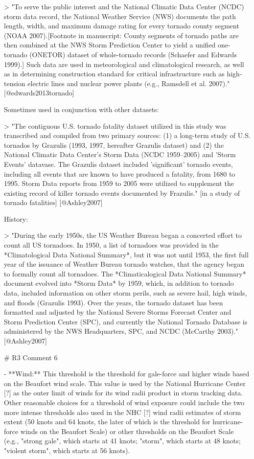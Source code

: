 > "To serve the public interest and the National Climatic Data Center (NCDC)
storm data record, the National Weather Service (NWS) documents the path length,
width, and maximum damage rating for every tornado county segment (NOAA
2007).[Footnote in manuscript: County segments of tornado paths are then
combined at the NWS Storm Prediction Center to yield a unified one-tornado
(ONETOR) dataset of whole-tornado records (Schaefer and Edwards 1999).] Such
data are used in meteorological and climatological research, as well as in
determining construction standard for critical infrastructure such as
high-tension electric lines and nuclear power plants (e.g., Ramsdell et al.
2007)." [@edwards2013tornado]

Sometimes used in conjunction with other datasets: 

> "The contiguous U.S. tornado fatality dataset utilized in this study was 
transcribed and compiled from two primary sources: (1) a long-term study of 
U.S. tornados by Grazulis (1993, 1997, hereafter Grazulis dataset) and 
(2) the National Climatic Data Center's Storm Data (NCDC 1959--2005) and 
'Storm Events' datavase. The Grazulis dataset included 'significant' tornado
events, including all events that are known to have produced a fatality, 
from 1680 to 1995. Storm Data reports from 1959 to 2005 were utilized to 
supplement the existing record of killer tornado events documented by 
Frazulis." [in a study of tornado fatalities] [@Ashley2007]

History: 

> "During the early 1950s, the US Weather Bureau began a concerted effort to
count all US tornadoes. In 1950, a list of tornadoes was provided in the
*Climatological Data National Summary*, but it was not until 1953, the first
full year of the issuance of Weather Bureau tornado watches, that the agency
began to formally count all tornadoes. The *Climaticalogical Data National
Summary* document evolved into *Storm Data* by 1959, which, in addition to
tornado data, included information on other storm perils, such as severe hail,
high winds, and floods (Grazulis 1993). Over the years, the tornado dataset has
been formatted and adjusted by the National Severe Storms Forecast Center and
Storm Prediction Center (SPC), and currently the National Tornado Database is
administered by the NWS Headquarters, SPC, and NCDC (McCarthy 2003)."
[@Ashley2007]

# R3 Comment 6

- **Wind:** This threshold is the threshold for gale-force and higher winds
based on the Beaufort wind scale. This value is used by the National Hurricane
Center [?] as the outer limit of winds for its wind radii product in storm 
tracking data. Other reasonable choices for a threshold of wind exposure 
could include the two more intense thresholds also used in the NHC [?] wind
radii estimates of storm extent (50 knots and 64 knots, the later of which 
is the threshold for hurricane-force winds on the Beaufort Scale) or other
thresholds on the Beaufort Scale (e.g., "strong gale", which starts at 
41 knots; "storm", which starts at 48 knots; "violent storm", which starts
at 56 knots).


